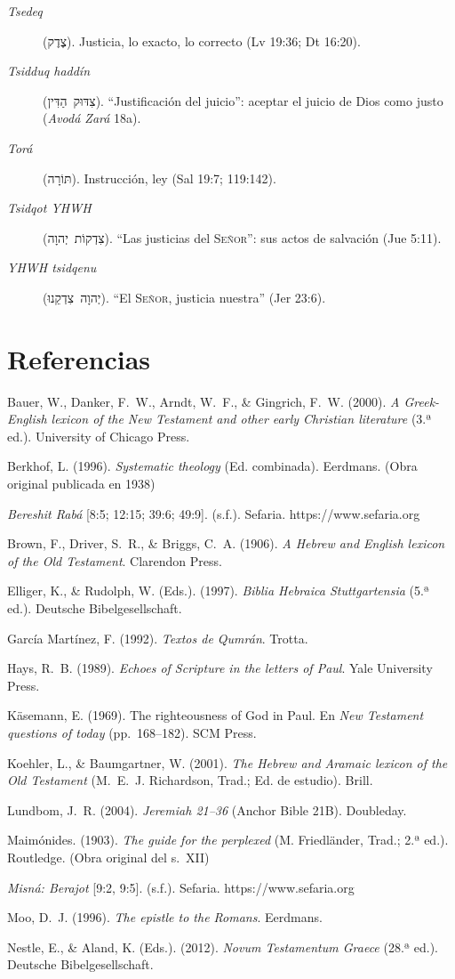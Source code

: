 \documentclass[11pt,letterpaper]{article}
\newcommand{\heb}[1]{\mbox{\foreignlanguage{hebrew}{#1}}}
\newcommand{\SENOR}{\textsc{Señor}}
\newcommand{\refapa}[1]{\par{\RaggedRight\hangindent=1.27cm\hangafter=1\noindent #1\par}\vspace{4pt}}
\begin{document}
\begin{description}
\item[\emph{Tsedeq}] (\heb{צֶדֶק}). Justicia, lo exacto, lo correcto (Lv 19:36; Dt 16:20).
\item[\emph{Tsidduq haddín}] (\heb{צִדּוּק הַדִּין}). ``Justificación del juicio'': aceptar el juicio de Dios como justo (\emph{Avodá Zará} 18a).
\item[\emph{Torá}] (\heb{תּוֹרָה}). Instrucción, ley (Sal 19:7; 119:142).
\item[\emph{Tsidqot YHWH}] (\heb{צִדְקוֹת יְהוָה}). ``Las justicias del \SENOR'': sus actos de salvación (Jue 5:11).
\item[\emph{YHWH tsidqenu}] (\heb{יְהוָה צִדְקֵנוּ}). ``El \SENOR, justicia nuestra'' (Jer 23:6).
\end{description}

\section*{Referencias}
\refapa{Bauer, W., Danker, F.~W., Arndt, W.~F., \& Gingrich, F.~W. (2000). \emph{A Greek-English lexicon of the New Testament and other early Christian literature} (3.ª ed.). University of Chicago Press.}
\refapa{Berkhof, L. (1996). \emph{Systematic theology} (Ed. combinada). Eerdmans. (Obra original publicada en 1938)}
\refapa{\emph{Bereshit Rabá} [8:5; 12:15; 39:6; 49:9]. (s.f.). Sefaria. https://www.sefaria.org}
\refapa{Brown, F., Driver, S.~R., \& Briggs, C.~A. (1906). \emph{A Hebrew and English lexicon of the Old Testament}. Clarendon Press.}
\refapa{Elliger, K., \& Rudolph, W. (Eds.). (1997). \emph{Biblia Hebraica Stuttgartensia} (5.ª ed.). Deutsche Bibelgesellschaft.}
\refapa{García Martínez, F. (1992). \emph{Textos de Qumrán}. Trotta.}
\refapa{Hays, R.~B. (1989). \emph{Echoes of Scripture in the letters of Paul}. Yale University Press.}
\refapa{Käsemann, E. (1969). The righteousness of God in Paul. En \emph{New Testament questions of today} (pp.~168--182). SCM Press.}
\refapa{Koehler, L., \& Baumgartner, W. (2001). \emph{The Hebrew and Aramaic lexicon of the Old Testament} (M.~E.~J. Richardson, Trad.; Ed. de estudio). Brill.}
\refapa{Lundbom, J.~R. (2004). \emph{Jeremiah 21--36} (Anchor Bible 21B). Doubleday.}
\refapa{Maimónides. (1903). \emph{The guide for the perplexed} (M. Friedländer, Trad.; 2.ª ed.). Routledge. (Obra original del s.~XII)}
\refapa{\emph{Misná: Berajot} [9:2, 9:5]. (s.f.). Sefaria. https://www.sefaria.org}
\refapa{Moo, D.~J. (1996). \emph{The epistle to the Romans}. Eerdmans.}
\refapa{Nestle, E., \& Aland, K. (Eds.). (2012). \emph{Novum Testamentum Graece} (28.ª ed.). Deutsche Bibelgesellschaft.}
\end{document}
